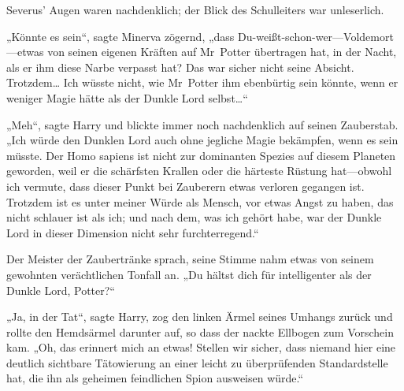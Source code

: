 Severus' Augen waren nachdenklich; der Blick des Schulleiters war unleserlich.

„Könnte es sein“, sagte Minerva zögernd, „dass Du-weißt-schon-wer—Voldemort—etwas von seinen eigenen Kräften auf Mr~Potter übertragen hat, in der Nacht, als er ihm diese Narbe verpasst hat? Das war sicher nicht seine Absicht. Trotzdem… Ich wüsste nicht, wie Mr~Potter ihm ebenbürtig sein könnte, wenn er weniger Magie hätte als der Dunkle Lord selbst…“

„Meh“, sagte Harry und blickte immer noch nachdenklich auf seinen Zauberstab. „Ich würde den Dunklen Lord auch ohne jegliche Magie bekämpfen, wenn es sein müsste. Der Homo sapiens ist nicht zur dominanten Spezies auf diesem Planeten geworden, weil er die schärfsten Krallen oder die härteste Rüstung hat—obwohl ich vermute, dass dieser Punkt bei Zauberern etwas verloren gegangen ist. Trotzdem ist es unter meiner Würde als Mensch, vor etwas Angst zu haben, das nicht schlauer ist als ich; und nach dem, was ich gehört habe, war der Dunkle Lord in dieser Dimension nicht sehr furchterregend.“

Der Meister der Zaubertränke sprach, seine Stimme nahm etwas von seinem gewohnten verächtlichen Tonfall an. „Du hältst dich für intelligenter als der Dunkle Lord, Potter?“

„Ja, in der Tat“, sagte Harry, zog den linken Ärmel seines Umhangs zurück und rollte den Hemdsärmel darunter auf, so dass der nackte Ellbogen zum Vorschein kam. „Oh, das erinnert mich an etwas! Stellen wir sicher, dass niemand hier eine deutlich sichtbare Tätowierung an einer leicht zu überprüfenden Standardstelle hat, die ihn als geheimen feindlichen Spion ausweisen würde.“


